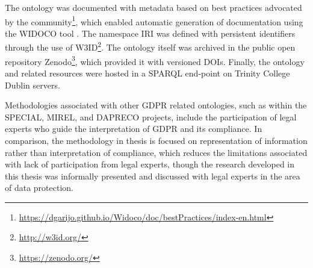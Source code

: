 The ontology was documented with metadata based on best practices advocated by the community\footnote{\url{https://dgarijo.github.io/Widoco/doc/bestPractices/index-en.html}}, which enabled automatic generation of documentation using the WIDOCO tool \cite{garijo_widoco:_2017}.
The namespace IRI was defined with persistent identifiers through the use of W3ID\footnote{\url{http://w3id.org/}}.
The ontology itself was archived in the public open repository Zenodo\footnote{\url{https://zenodo.org/}}, which provided it with versioned DOIs.
Finally, the ontology and related resources were hosted in a SPARQL end-point on Trinity College Dublin servers.

Methodologies associated with other GDPR related ontologies, such as within the SPECIAL, MIREL, and DAPRECO projects, include the participation of legal experts who guide the interpretation of GDPR and its compliance.
In comparison, the methodology in thesis is focused on representation of information rather than interpretation of compliance, which reduces the limitations associated with lack of participation from legal experts,
though the research developed in this thesis was informally presented and discussed with legal experts in the area of data protection.

